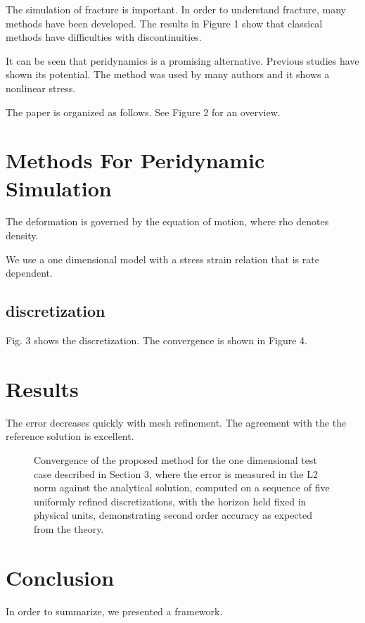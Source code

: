 \documentclass{article}
\begin{document}
The simulation of fracture is important. In order to understand fracture,
many methods have been developed. The results in Figure 1 show that classical
methods have difficulties with discontinuities.  %

It can be seen that peridynamics is a promising alternative. Previous studies
have shown its potential. The method was used by many authors and it shows a
nonlinear stress.  %

The paper is organized as follows. See Figure 2 for an overview.  %

\section{Methods For Peridynamic Simulation}  %

The deformation is governed by the equation of motion, where rho denotes
density.


We use a one dimensional model with a stress strain relation that is rate
dependent.  %

\subsection{discretization}  %

Fig. 3 shows the discretization. The convergence is shown in Figure 4.

\section{Results}

The error decreases quickly with mesh refinement. The agreement with the
the reference solution is excellent.  %

\begin{figure}
  \centering
  \caption{Convergence of the proposed method for the one dimensional test
  case described in Section 3, where the error is measured in the L2 norm
  against the analytical solution, computed on a sequence of five uniformly
  refined discretizations, with the horizon held fixed in physical units,
  demonstrating second order accuracy as expected from the theory.}
  \label{fig:convergence-unused}  %
\end{figure}

\section{Conclusion}

In order to summarize, we presented a framework.  %
\end{document}
